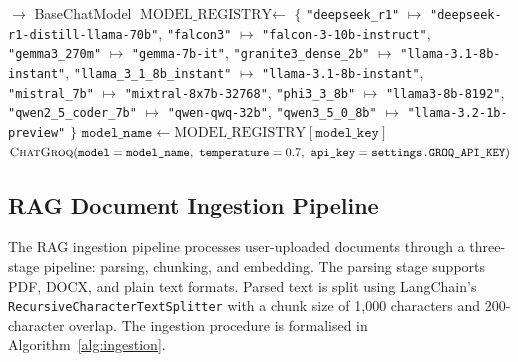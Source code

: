 \documentclass[12pt,a4paper]{article}
\newcommand{\ty}[1]{\texttt{#1}}
\begin{document}
\begin{algorithm}[H]
\caption{LLM factory function mapping model keys to Groq-hosted model instances.}
\label{alg:build_llm}
\begin{algorithmic}[1]
  \Function{BuildLLM}{\ty{model\_key}: str} $\to$ BaseChatModel
  \State $\text{MODEL\_REGISTRY} \gets$
  \State \hspace{\algorithmicindent}
    $\{$
    \ty{"deepseek\_r1"} $\mapsto$ \ty{"deepseek-r1-distill-llama-70b"},
  \State \hspace{\algorithmicindent}
    \ty{"falcon3"} $\mapsto$ \ty{"falcon-3-10b-instruct"},
  \State \hspace{\algorithmicindent}
    \ty{"gemma3\_270m"} $\mapsto$ \ty{"gemma-7b-it"},
  \State \hspace{\algorithmicindent}
    \ty{"granite3\_dense\_2b"} $\mapsto$ \ty{"llama-3.1-8b-instant"},
  \State \hspace{\algorithmicindent}
    \ty{"llama\_3\_1\_8b\_instant"} $\mapsto$ \ty{"llama-3.1-8b-instant"},
  \State \hspace{\algorithmicindent}
    \ty{"mistral\_7b"} $\mapsto$ \ty{"mixtral-8x7b-32768"},
  \State \hspace{\algorithmicindent}
    \ty{"phi3\_3\_8b"} $\mapsto$ \ty{"llama3-8b-8192"},
  \State \hspace{\algorithmicindent}
    \ty{"qwen2\_5\_coder\_7b"} $\mapsto$ \ty{"qwen-qwq-32b"},
  \State \hspace{\algorithmicindent}
    \ty{"qwen3\_5\_0\_8b"} $\mapsto$ \ty{"llama-3.2-1b-preview"}
    $\}$
  \State $\ty{model\_name} \gets \text{MODEL\_REGISTRY}\!\left[\ty{model\_key}\right]$
  \State \Return $\Call{ChatGroq}{\ty{model}=\ty{model\_name},\ \ty{temperature}=0.7,\ \ty{api\_key}=\ty{settings.GROQ\_API\_KEY}}$
\EndFunction
\end{algorithmic}
\end{algorithm}

\subsection{RAG Document Ingestion Pipeline}

The RAG ingestion pipeline processes user-uploaded documents through a three-stage pipeline: parsing, chunking, and embedding. The parsing stage supports PDF, DOCX, and plain text formats. Parsed text is split using LangChain's \texttt{RecursiveCharacterTextSplitter} with a chunk size of 1,000 characters and 200-character overlap. The ingestion procedure is formalised in Algorithm~\ref{alg:ingestion}.
\end{document}
